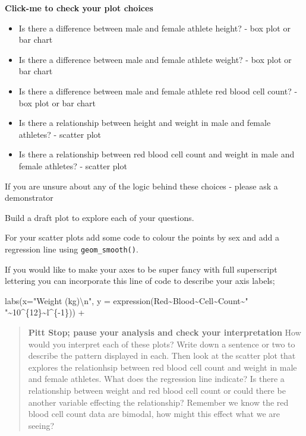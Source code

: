 \documentclass[
]{book}
\newenvironment{Shaded}{\begin{snugshade}}{\end{snugshade}}
\newcommand{\AttributeTok}[1]{\textcolor[rgb]{0.77,0.63,0.00}{#1}}
\newcommand{\DecValTok}[1]{\textcolor[rgb]{0.00,0.00,0.81}{#1}}
\newcommand{\FunctionTok}[1]{\textcolor[rgb]{0.00,0.00,0.00}{#1}}
\newcommand{\NormalTok}[1]{#1}
\newcommand{\SpecialCharTok}[1]{\textcolor[rgb]{0.00,0.00,0.00}{#1}}
\newcommand{\StringTok}[1]{\textcolor[rgb]{0.31,0.60,0.02}{#1}}
\providecommand{\tightlist}{%
  \setlength{\itemsep}{0pt}\setlength{\parskip}{0pt}}
\begin{document}
\textbf{Click-me to check your plot choices}

\begin{itemize}
\tightlist
\item
  Is there a difference between male and female athlete height? - box plot or bar chart
\item
  Is there a difference between male and female athlete weight? - box plot or bar chart
\item
  Is there a difference between male and female athlete red blood cell count? - box plot or bar chart
\item
  Is there a relationship between height and weight in male and female athletes? - scatter plot
\item
  Is there a relationship between red blood cell count and weight in male and female athletes? - scatter plot
\end{itemize}

If you are unsure about any of the logic behind these choices - please ask a demonstrator

Build a draft plot to explore each of your questions.

For your scatter plots add some code to colour the points by sex and add a regression line using \texttt{geom\_smooth()}.

If you would like to make your axes to be super fancy with full superscript lettering you can incorporate this line of code to describe your axis labels;

\begin{Shaded}
\begin{Highlighting}[]
\FunctionTok{labs}\NormalTok{(}\AttributeTok{x=}\StringTok{"Weight (kg)}\SpecialCharTok{\textbackslash{}n}\StringTok{"}\NormalTok{, }\AttributeTok{y =} \FunctionTok{expression}\NormalTok{(Red}\SpecialCharTok{\textasciitilde{}}\NormalTok{Blood}\SpecialCharTok{\textasciitilde{}}\NormalTok{Cell}\SpecialCharTok{\textasciitilde{}}\NormalTok{Count}\SpecialCharTok{\textasciitilde{}}\StringTok{" "}\SpecialCharTok{\textasciitilde{}}\DecValTok{10}\SpecialCharTok{\^{}}\NormalTok{\{}\DecValTok{12}\NormalTok{\}}\SpecialCharTok{\textasciitilde{}}\NormalTok{l}\SpecialCharTok{\^{}}\NormalTok{\{}\SpecialCharTok{{-}}\DecValTok{1}\NormalTok{\})) }\SpecialCharTok{+}
\end{Highlighting}
\end{Shaded}

\begin{quote}
\textbf{Pitt Stop; pause your analysis and check your interpretation}
How would you interpret each of these plots? Write down a sentence or two to describe the pattern displayed in each. Then look at the scatter plot that explores the relationhsip between red blood cell count and weight in male and female athletes. What does the regression line indicate? Is there a relationship between weight and red blood cell count or could there be another variable effecting the relationship? Remember we know the red blood cell count data are bimodal, how might this effect what we are seeing?
\end{quote}
\end{document}
